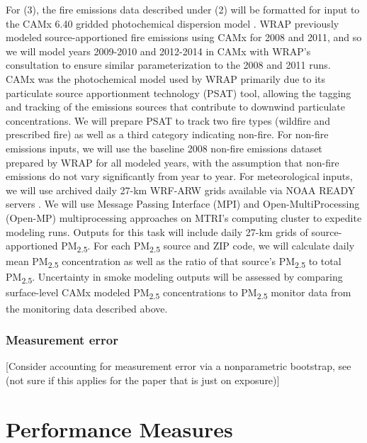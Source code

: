 \documentclass[authoryear]{elsarticle}
\begin{document}
For (3), the fire emissions data described under (2) will be formatted for input to the CAMx 6.40 gridded photochemical dispersion model \citep{CAMx2017}. WRAP previously modeled source-apportioned fire emissions using CAMx for 2008 and 2011, and so we will model years 2009-2010 and 2012-2014 in CAMx with WRAP’s consultation to ensure similar parameterization to the 2008 and 2011 runs. CAMx was the photochemical model used by WRAP primarily due to its particulate source apportionment technology (PSAT) tool, allowing the tagging and tracking of the emissions sources that contribute to downwind particulate concentrations. We will prepare PSAT to track two fire types (wildfire and prescribed fire) as well as a third category indicating non-fire. For non-fire emissions inputs, we will use the baseline 2008 non-fire emissions dataset prepared by WRAP for all modeled years, with the assumption that non-fire emissions do not vary significantly from year to year. For meteorological inputs, we will use archived daily 27-km WRF-ARW grids available via NOAA READY servers \citep{Wang2007,Rolph2017}. We will use Message Passing Interface (MPI) and Open-MultiProcessing (Open-MP) multiprocessing approaches on MTRI's computing cluster to expedite modeling runs. Outputs for this task will include daily 27-km grids of source-apportioned PM\textsubscript{2.5}. For each PM\textsubscript{2.5} source and ZIP code, we will calculate daily mean PM\textsubscript{2.5} concentration as well as the ratio of that source’s PM\textsubscript{2.5} to total PM\textsubscript{2.5}. Uncertainty in smoke modeling outputs will be assessed by comparing surface-level CAMx modeled PM\textsubscript{2.5} concentrations to PM\textsubscript{2.5} monitor data from the monitoring data described above.

\subsubsection{Measurement error}

[Consider accounting for measurement error via a nonparametric bootstrap, see \cite{Keller2017} (not sure if this applies for the paper that is just on exposure)]

\section{Performance Measures}
\end{document}
